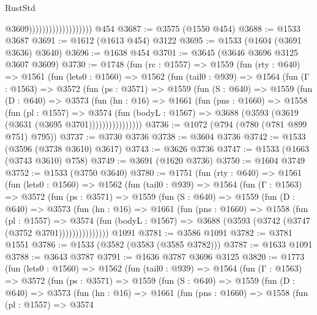 \begin{lexlean}{RustStd}
\begin{coremodule}
                                          @3609)))))))))))))))))))
    @454
@3687 := @3575 (@1550 @454)
@3688 := @1533 @3687
@3691 := @1612 (@1613 @454) @3122
@3695 := @1533 (@1604 (@3691 @3636) @3640)
@3696 := @1638 @454
@3701 := @3645 (@3646 @3696 @3125 @3607 @3609)
@3730 := @1748
    (fun (rc : @1557) =>
    @1559
      (fun (rty : @640) =>
      @1561
        (fun (lets0 : @1560) =>
        @1562
          (fun (tail0 : @939) =>
          @1564
            (fun (Γ : @1563) =>
            @3572
              (fun (ps : @3571) =>
              @1559
                (fun (S : @640) =>
                @1559
                  (fun (D : @640) =>
                  @3573
                    (fun (hn : @16) =>
                    @1661
                      (fun (pns : @1660) =>
                      @1558
                        (fun (pl : @1557) =>
                        @3574
                          (fun (bodyL : @1567) =>
                          @3688 (@3593 (@3619 (@3631 (@3695 @3701))))))))))))))))
@3736 := @1072 (@794 (@780 (@781 @899 @751) @795))
@3737 := @3730 @3736
@3738 := @3604 @3736
@3742 := @1533 (@3596 (@3738 @3610) @3617)
@3743 := @3626 @3736
@3747 := @1533 (@1663 (@3743 @3610) @758)
@3749 := @3691 (@1620 @3736)
@3750 := @1604 @3749
@3752 := @1533 (@3750 @3640)
@3780 := @1751
    (fun (rty : @640) =>
    @1561
      (fun (lets0 : @1560) =>
      @1562
        (fun (tail0 : @939) =>
        @1564
          (fun (Γ : @1563) =>
          @3572
            (fun (ps : @3571) =>
            @1559
              (fun (S : @640) =>
              @1559
                (fun (D : @640) =>
                @3573
                  (fun (hn : @16) =>
                  @1661
                    (fun (pns : @1660) =>
                    @1558
                      (fun (pl : @1557) =>
                      @3574
                        (fun (bodyL : @1567) =>
                        @3688 (@3593 (@3742 (@3747 (@3752 @3701)))))))))))))))
    @1091
@3781 := @3586 @1091
@3782 := @3781 @1551
@3786 := @1533 (@3582 (@3583 (@3585 @3782)))
@3787 := @1633 @1091
@3788 := @3643 @3787
@3791 := @1636 @3787 @3696 @3125
@3820 := @1773
    (fun (lets0 : @1560) =>
    @1562
      (fun (tail0 : @939) =>
      @1564
        (fun (Γ : @1563) =>
        @3572
          (fun (ps : @3571) =>
          @1559
            (fun (S : @640) =>
            @1559
              (fun (D : @640) =>
              @3573
                (fun (hn : @16) =>
                @1661
                  (fun (pns : @1660) =>
                  @1558
                    (fun (pl : @1557) =>
                    @3574

\end{coremodule}
\end{lexlean}
